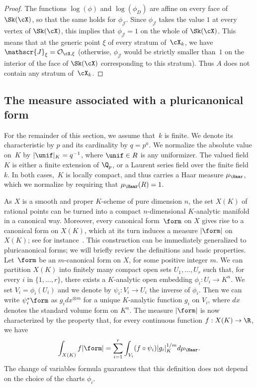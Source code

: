 \begin{proof}
The functions $\log(\phi)$ and $\log(\phi_D)$ are affine on every face of $\Sk(\cX)$, so that the same holds for $\phi_{\mathscr{J}}$. Since $\phi_{\mathscr{J}}$ takes the value $1$ at every vertex of $\Sk(\cX)$, this implies that $\phi_{\mathscr{J}}=1$ on the whole of $\Sk(\cX)$. This means that at the generic point $\xi$ of every stratum of~$\cX_k$, we have $\mathscr{J}_{\xi}=\mathcal{O}_{\cX,\xi}$ (otherwise, $\phi_{\mathscr{J}}$ would be strictly smaller than~$1$ on the interior of the face of $\Sk(\cX)$ corresponding to this stratum). Thus $A$ does not contain any stratum of~$\cX_k$.
\end{proof}

\subsection{The measure associated with a pluricanonical form}\label{ss:pluri}
For the remainder of this section, we assume that~$k$ is finite. We denote its characteristic by $p$ and its cardinality by $q=p^a$. We normalize the absolute value on~$K$ by $|\unif|_K=q^{-1}$, where $\unif\in R$ is any uniformizer.
The valued field~$K$ is either a finite extension of $\Q_p$, or a Laurent series field over the finite field~$k$. In both cases,~$K$ is locally compact,
and thus carries a Haar measure $\mu_{\Haar}$, which we normalize by requiring that $\mu_{\Haar}(R)=1$.

As $X$ is a smooth and proper $K$\nobreakdash-scheme of pure dimension $n$, the set $X(K)$ of rational points can be turned into a compact $n$-dimensional $K$\nobreakdash-analytic manifold in a canonical way.
Moreover, every canonical form~$\form$ on $X$ gives rise to a canonical form on $X(K)$, which at its turn induces a measure $|\form|$ on $X(K)$; see for instance~\cite[\S1.1]{ChNiSe}. This construction can be immediately generalized to pluricanonical forms; we will briefly review the definitions and basic properties. Let~$\form$ be an $m$-canonical form on $X$, for some positive integer $m$. We can partition $X(K)$ into finitely many compact open sets $U_1,\ldots,U_r$ such that, for every $i$ in $\{1,\ldots,r\}$, there exists a $K$\nobreakdash-analytic open embedding
$\phi_i:U_i\to K^n$. We set $V_i=\phi_i(U_i)$ and we denote by $\psi_i:V_i\to U_i$ the inverse of $\phi_i$. Then we can write $\psi_i^* \form$ as
$g_i dx^{\otimes m}$ for a unique $K$\nobreakdash-analytic function $g_i$ on $V_i$, where $dx$ denotes the standard volume form on $K^n$.
The measure $|\form|$ is now characterized by the property that, for every continuous function $f:X(K)\to \R$, we have
\[
\int_{X(K)} f |\form|=\sum_{i=1}^r \int_{V_i}(f\circ \psi_i)|g_i|^{1/m}_K d\mu_{\Haar}.
\]
The change of variables formula guarantees that this definition does not depend on the choice of the charts $\phi_i$.

